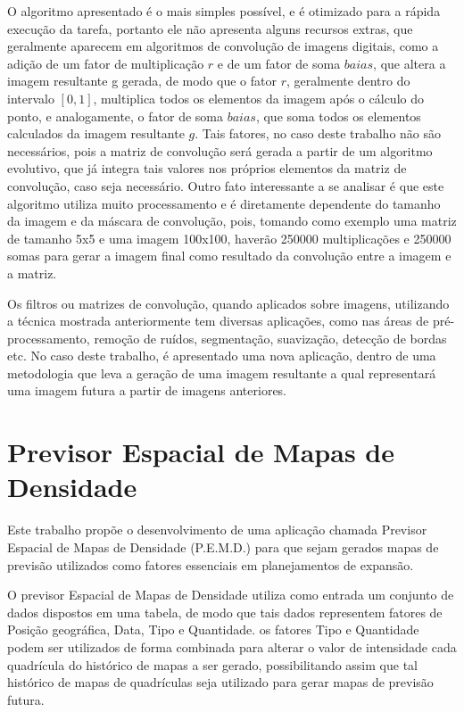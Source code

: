 O algoritmo apresentado é o mais simples possível, e é otimizado para a rápida execução da tarefa, portanto ele não apresenta alguns recursos extras, que geralmente aparecem em algoritmos de convolução de imagens digitais, como a adição de um fator de multiplicação \(r\) e de um fator de soma \(baias\), que altera a imagem resultante g gerada, de modo que o fator \(r\), geralmente dentro do intervalo \([0,1]\), multiplica todos os elementos da imagem após o cálculo do ponto, e analogamente, o fator de soma \(baias\), que soma todos os elementos calculados da imagem resultante \(g\).  Tais fatores, no caso deste trabalho não são necessários, pois a matriz de convolução será gerada a partir de um algoritmo evolutivo, que já integra tais valores nos próprios elementos da matriz de convolução, caso seja necessário. Outro fato interessante a se analisar é que este algoritmo utiliza muito processamento e é diretamente dependente do tamanho da imagem e da máscara de convolução, pois, tomando como exemplo uma matriz de tamanho 5x5 e uma imagem 100x100, haverão 250000 multiplicações e 250000 somas para gerar a imagem final como resultado da convolução entre a imagem e a matriz.

Os filtros ou matrizes de convolução, quando aplicados sobre imagens, utilizando a técnica mostrada anteriormente tem diversas aplicações, como nas áreas de pré-processamento, remoção de ruídos, segmentação, suavização, detecção de bordas etc. No caso deste trabalho, é apresentado uma nova aplicação, dentro de uma metodologia que leva a geração de uma imagem resultante a qual representará uma imagem futura a partir de imagens anteriores.


\section{Previsor Espacial de Mapas de Densidade}

Este trabalho propõe o desenvolvimento de uma aplicação chamada Previsor Espacial de Mapas de Densidade (P.E.M.D.) para que sejam gerados mapas de previsão utilizados como fatores essenciais em planejamentos de expansão.

O previsor Espacial de Mapas de Densidade utiliza como entrada um conjunto de dados dispostos em uma tabela, de modo que tais dados representem fatores de Posição geográfica, Data, Tipo e Quantidade. os fatores Tipo e Quantidade podem ser utilizados de forma combinada para alterar o valor de intensidade cada quadrícula do histórico de mapas a ser gerado, possibilitando assim que tal histórico de mapas de quadrículas seja utilizado para gerar mapas de previsão futura.


